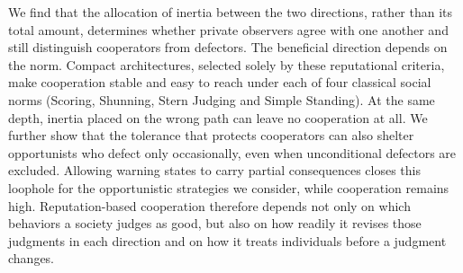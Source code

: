 \documentclass[11pt]{article}
\begin{document}
We find that the allocation of inertia between the two directions, rather than its total amount, determines whether private observers agree with one another and still distinguish cooperators from defectors. The beneficial direction depends on the norm. Compact architectures, selected solely by these reputational criteria, make cooperation stable and easy to reach under each of four classical social norms (Scoring, Shunning, Stern Judging and Simple Standing). At the same depth, inertia placed on the wrong path can leave no cooperation at all. We further show that the tolerance that protects cooperators can also shelter opportunists who defect only occasionally, even when unconditional defectors are excluded. Allowing warning states to carry partial consequences closes this loophole for the opportunistic strategies we consider, while cooperation remains high. Reputation-based cooperation therefore depends not only on which behaviors a society judges as good, but also on how readily it revises those judgments in each direction and on how it treats individuals before a judgment changes.



\end{document}
